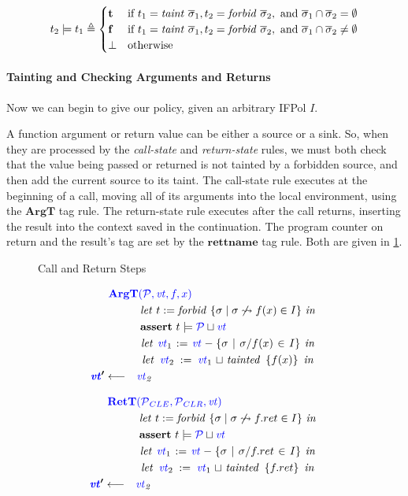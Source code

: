 \documentclass[acmsmall,review,anonymous]{acmart}\settopmatter{printfolios=true,printccs=false,printacmref=false}
\begin{document}
%
\[t_2 \models t_1 \triangleq
\begin{cases}
  \mathbf{t} & \textnormal{if } t_1 = \mathit{taint} ~ \overline{\sigma}_1,
  t_2 = \mathit{forbid} ~ \overline{\sigma}_2, \textnormal{ and }
  \overline{\sigma}_1 \cap \overline{\sigma}_2 = \emptyset \\
  \mathbf{f} & \textnormal{if } t_1 = \mathit{taint} ~ \overline{\sigma}_1,
  t_2 = \mathit{forbid} ~ \overline{\sigma}_2, \textnormal{ and }
  \overline{\sigma}_1 \cap \overline{\sigma}_2 \not = \emptyset \\
  \bot & \textnormal{otherwise} \\
\end{cases}\]

\paragraph{Tainting and Checking Arguments and Returns}

Now we can begin to give our policy, given an arbitrary IFPol \(I\).

A function argument or return value can be either a source or a sink.
So, when they are processed by the {\em call-state} and {\em return-state} rules,
we must both check that the value being passed or returned is not tainted by a forbidden
source, and then add the current source to its taint.
The call-state rule executes at the beginning of a call, moving all of its arguments into
the local environment, using the \(\mathbf{ArgT}\) tag rule.
The return-state rule executes after the call returns, inserting the result into the
context saved in the continuation. The program counter on return and the result's tag are
set by the \(\mathbf{rettname}\) tag rule. Both are given in \cref{fig:callretsteps}.

\begin{figure}
  \callstep
  \returnstep
  \caption{Call and Return Steps}
  \label{fig:callretsteps}
\end{figure}
  
\begin{minipage}[t]{.49\textwidth}
  \[\begin{aligned}
  \truledef{\argt}
  \letin{t := \mathit{forbid} ~ \{\sigma \mid \sigma \not \rightsquigarrow f(x) \in I\}}
  \assert{t \models \PCT \sqcup \vt}
  \letin{\vt_1 := \vt - \{\sigma \mid \sigma / f(x) \in I \}}
  \letin{\vt_2 := \vt_1 \sqcup \mathit{tainted} ~ \{f(x)\}}
  \settag{\vt'}{\vt_2}
  \end{aligned}\]
\end{minipage}
\begin{minipage}[t]{.49\textwidth}            
  \[\begin{aligned}
  \truledef{\rett}
  \letin{t := \mathit{forbid} ~ \{\sigma \mid \sigma \not \rightsquigarrow f.ret \in I\}}
  \assert{t \models \PCT \sqcup \vt}
  \letin{\vt_1 := \vt - \{\sigma \mid \sigma / f.ret \in I \}}
  \letin{\vt_2 := \vt_1 \sqcup \mathit{tainted} ~ \{f.ret\}}
  \settag{\vt'}{\vt_2}
  \end{aligned}\]
\end{minipage}
\end{document}
